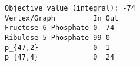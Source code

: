 \begin{verbatim}
Objective value (integral): -74
Vertex/Graph         In Out 
Fructose-6-Phosphate 0  74  
Ribulose-5-Phosphate 99 0   
p_{47,2}             0  1   
p_{47,4}             0  24  
\end{verbatim}
